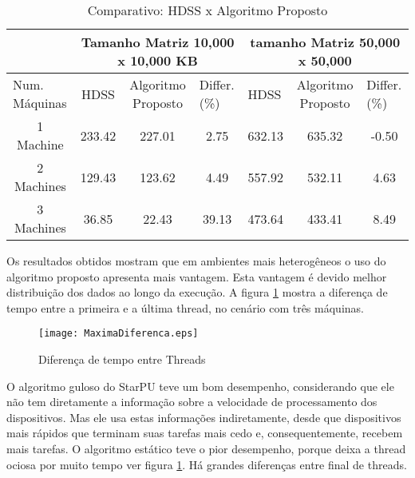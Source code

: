 \begin{table}[h]
\centering
\tiny
\caption{Comparativo: HDSS x Algoritmo Proposto}

\begin{tabular}{c|c|c|c|c|c|c|}
\cline{2-7}
\multicolumn{1}{l|}{}                 & \multicolumn{3}{c|}{Tamanho Matriz 10,000 x 10,000 KB}                     & \multicolumn{3}{c|}{tamanho Matriz 50,000 x 50,000 }                                       \\ \hline
\multicolumn{1}{|l|}{Num. Máquinas} & HDSS   & Algoritmo Proposto& \multicolumn{1}{l|}{Differ. (\%)} & \multicolumn{1}{l|}{HDSS} & Algoritmo Proposto& \multicolumn{1}{l|}{Differ. (\%)} \\ \hline
\multicolumn{1}{|c|}{1 Machine}       & 233.42 & 227.01        & 2.75                                 & 632.13                    & 635.32        & -0.50                                \\ \hline
\multicolumn{1}{|c|}{2 Machines}      & 129.43 & 123.62        & 4.49                                 & 557.92                    & 532.11        & 4.63                                 \\ \hline
\multicolumn{1}{|c|}{3 Machines}      & 36.85  & 22.43         & 39.13                                & 473.64                    & 433.41        &            8.49                          \\ \hline
\end{tabular}
\label{table: comparativo}
\end{table}

Os resultados obtidos mostram que em ambientes mais heterogêneos o uso do algoritmo proposto apresenta mais vantagem. Esta vantagem é devido melhor distribuição dos dados ao longo da execução. A figura \ref{fig:diferencaThreads} mostra a diferença de tempo entre a primeira e a última thread, no cenário com três máquinas.

\begin{figure}[htb]
	\begin{center}
	\centering
			\texttt{[image: MaximaDiferenca.eps]}
	\caption{Diferença de tempo entre Threads}
	\label{fig:diferencaThreads}
	\end{center}
\end{figure}

O algoritmo guloso do StarPU teve um bom desempenho, considerando que ele não tem diretamente a informação sobre a velocidade de processamento dos dispositivos. Mas ele usa estas informações indiretamente, desde que dispositivos mais rápidos que terminam suas tarefas mais cedo e, consequentemente, recebem mais tarefas. O algoritmo estático teve o pior desempenho, porque deixa a thread ociosa por muito tempo ver figura \ref{fig:diferencaThreads}. Há grandes diferenças entre final de threads. 


